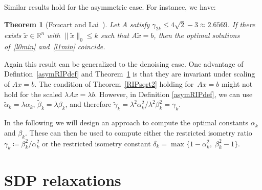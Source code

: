 \documentclass[a4paper,11pt,1p]{elsarticle}
\newtheorem{thm}{Theorem}
\newcommand{\define}{\coloneqq}
\newcommand{\Norm}[2]{\lVert{#1}\rVert_{#2}}
\newcommand{\R}{\mathds{R}}
\begin{document}
Similar results hold for the asymmetric case. For instance, we have:

\begin{thm}[Foucart and Lai~\cite{FL09}]\label{asymRIPtheorem}
  Let $A$ satisfy $\gamma_{2k} \leq 4 \sqrt{2} - 3 \approx 2.6569$. If
  there exists $\tilde{x} \in \R^n$ with $\Norm{\tilde{x}}{0} \leq k$ such
  that $A\tilde{x} = b$, then the optimal solutions of~\eqref{l0min}
  and~\eqref{l1min} coincide.
\end{thm}

Again this result can be generalized to the denoising case. One advantage
of Defintion~\ref{asymRIPdef} and Theorem~\ref{asymRIPtheorem} is that they
are invariant under scaling of $Ax = b$. The condition of
Theorem~\ref{RIPsqrt2} holding for~$A x = b$ might not hold for the scaled
$\lambda Ax = \lambda b$. However, in Definition \ref{asymRIPdef}, we can
use $\tilde{\alpha}_k = \lambda \alpha_k$, $\tilde{\beta}_k = \lambda
\beta_k$, and therefore $\tilde{\gamma}_k = \lambda^2 \alpha_k^2 /
\lambda^2 \beta_k^2 = \gamma_k$.

In the following we will design an approach to compute the optimal
constants $\alpha_k$ and $\beta_k$. These can then be used to compute
either the restricted isometry ratio $\gamma_k \define \beta_k^2 / \alpha_k^2$
or the restricted isometry constant $\delta_k = \max \{ 1 - \alpha_k^2,\;
\beta_k^2 - 1 \}$.

\section{SDP relaxations}
\label{sec:SDPrelax}
\end{document}
